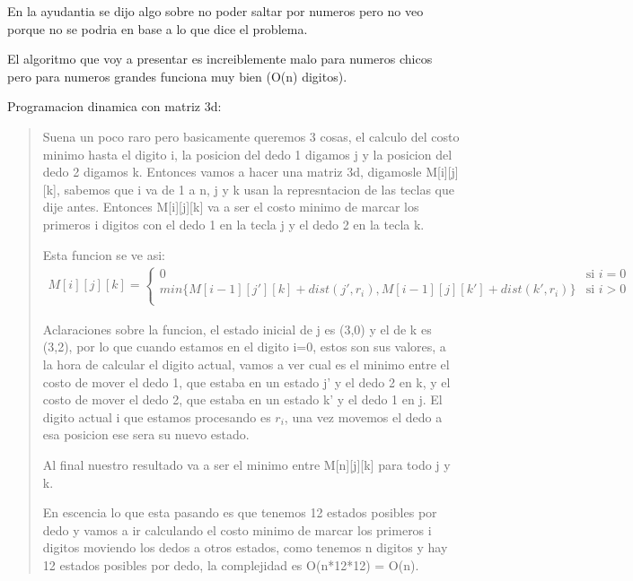En la ayudantia se dijo algo sobre no poder saltar por numeros pero no veo porque no se podria en base a lo que dice el problema. \vspace{.2cm}

El algoritmo que voy a presentar es increiblemente malo para numeros chicos pero para numeros grandes funciona muy bien (O(n) digitos). \vspace{.2cm}

\textcolor{bibi}{Programacion dinamica con matriz 3d:} \vspace{.2cm}
\begin{quote}
    Suena un poco raro pero basicamente queremos 3 cosas, el calculo del costo minimo hasta el digito i, la posicion del dedo 1 digamos j y la posicion del dedo 2 digamos k. Entonces vamos a hacer una matriz 3d, digamosle M[i][j][k], sabemos que i va de 1 a n, j y k usan la represntacion de las teclas que dije antes. Entonces M[i][j][k] va a ser el costo minimo de marcar los primeros i digitos con el dedo 1 en la tecla j y el dedo 2 en la tecla k. \vspace{.2cm}

    Esta funcion se ve asi: \vspace{.2cm}
    \begin{align*}
        M[i][j][k]=\begin{cases}
            0 & \text{si } i=0 \\
            min\{M[i-1][j'][k]+dist(j',r_i), M[i-1][j][k']+dist(k',r_i)\} & \text{si } i>0 \\
        \end{cases}
    \end{align*}

    Aclaraciones sobre la funcion, el estado inicial de j es (3,0) y el de k es (3,2), por lo que cuando estamos en el digito i=0, estos son sus valores, a la hora de calcular el digito actual, vamos a ver cual es el minimo entre el costo de mover el dedo 1, que estaba en un estado j' y el dedo 2 en k, y el costo de mover el dedo 2, que estaba en un estado k' y el dedo 1 en j. El digito actual i que estamos procesando es $r_i$, una vez movemos el dedo a esa posicion ese sera su nuevo estado. \vspace{.2cm}

    Al final nuestro resultado va a ser el minimo entre M[n][j][k] para todo j y k. \vspace{.2cm}

    En escencia lo que esta pasando es que tenemos 12 estados posibles por dedo y vamos a ir calculando el costo minimo de marcar los primeros i digitos moviendo los dedos a otros estados, como tenemos n digitos y hay 12 estados posibles por dedo, la complejidad es O(n*12*12) = O(n).
\end{quote}